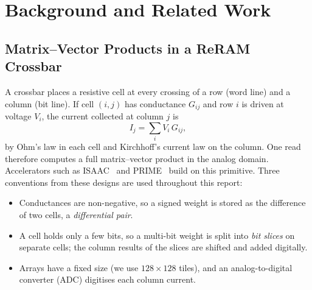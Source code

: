 \section{Background and Related Work}\label{sec:background}

\subsection{Matrix--Vector Products in a ReRAM Crossbar}
A crossbar places a resistive cell at every crossing of a row (word line) and a column (bit line). If
cell $(i,j)$ has conductance $G_{ij}$ and row $i$ is driven at voltage $V_i$, the current collected at
column $j$ is
\begin{equation}
I_j=\sum_i V_i\,G_{ij},
\label{eq:crossbar}
\end{equation}
by Ohm's law in each cell and Kirchhoff's current law on the column. One read therefore computes a full
matrix--vector product in the analog domain. Accelerators such as ISAAC~\cite{shafiee2016isaac} and
PRIME~\cite{chi2016prime} build on this primitive. Three conventions from these designs are used
throughout this report:
\begin{itemize}
\item Conductances are non-negative, so a signed weight is stored as the difference of two cells, a
\emph{differential pair}.
\item A cell holds only a few bits, so a multi-bit weight is split into \emph{bit slices} on separate
cells; the column results of the slices are shifted and added digitally.
\item Arrays have a fixed size (we use $128\times128$ tiles), and an analog-to-digital converter (ADC)
digitises each column current.
\end{itemize}

